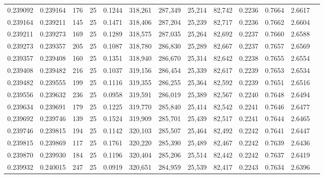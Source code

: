 \begin{tabular}{rrrrrrrrrrrrr}
0.239092 & 0.239164 &   176 &  25 &                                     0.1244 & 318,261 & 287,349 &  25,214 &  82,742 & 0.2236 & 0.7664 & 2.6617 \\
0.239164 & 0.239211 &   145 &  25 &                                     0.1471 & 318,406 & 287,204 &  25,239 &  82,717 & 0.2236 & 0.7662 & 2.6604 \\
0.239211 & 0.239273 &   169 &  25 &                                     0.1289 & 318,575 & 287,035 &  25,264 &  82,692 & 0.2237 & 0.7660 & 2.6588 \\
0.239273 & 0.239357 &   205 &  25 &                                     0.1087 & 318,780 & 286,830 &  25,289 &  82,667 & 0.2237 & 0.7657 & 2.6569 \\
0.239357 & 0.239408 &   160 &  25 &                                     0.1351 & 318,940 & 286,670 &  25,314 &  82,642 & 0.2238 & 0.7655 & 2.6554 \\
0.239408 & 0.239482 &   216 &  25 &                                     0.1037 & 319,156 & 286,454 &  25,339 &  82,617 & 0.2239 & 0.7653 & 2.6534 \\
0.239482 & 0.239555 &   199 &  25 &                                     0.1116 & 319,355 & 286,255 &  25,364 &  82,592 & 0.2239 & 0.7651 & 2.6516 \\
0.239556 & 0.239632 &   236 &  25 &                                     0.0958 & 319,591 & 286,019 &  25,389 &  82,567 & 0.2240 & 0.7648 & 2.6494 \\
0.239634 & 0.239691 &   179 &  25 &                                     0.1225 & 319,770 & 285,840 &  25,414 &  82,542 & 0.2241 & 0.7646 & 2.6477 \\
0.239692 & 0.239746 &   139 &  25 &                                     0.1524 & 319,909 & 285,701 &  25,439 &  82,517 & 0.2241 & 0.7644 & 2.6465 \\
0.239746 & 0.239815 &   194 &  25 &                                     0.1142 & 320,103 & 285,507 &  25,464 &  82,492 & 0.2242 & 0.7641 & 2.6447 \\
0.239815 & 0.239869 &   117 &  25 &                                     0.1761 & 320,220 & 285,390 &  25,489 &  82,467 & 0.2242 & 0.7639 & 2.6436 \\
0.239870 & 0.239930 &   184 &  25 &                                     0.1196 & 320,404 & 285,206 &  25,514 &  82,442 & 0.2242 & 0.7637 & 2.6419 \\
0.239932 & 0.240015 &   247 &  25 &                                     0.0919 & 320,651 & 284,959 &  25,539 &  82,417 & 0.2243 & 0.7634 & 2.6396 \\

\end{tabular}
